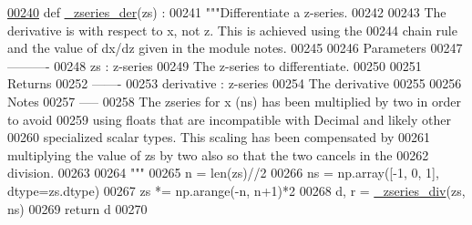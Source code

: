 \begin{DoxyCode}
\hypertarget{namespacepyneb_1_1utils_1_1chebyshev_l00240}{}\hyperlink{namespacepyneb_1_1utils_1_1chebyshev_adb39b6e9d3aba3bf3784a3364ec3e6ca}{00240} \textcolor{keyword}{def }\hyperlink{namespacepyneb_1_1utils_1_1chebyshev_adb39b6e9d3aba3bf3784a3364ec3e6ca}{\_zseries\_der}(zs) :
00241     \textcolor{stringliteral}{"""Differentiate a z-series.}
00242 \textcolor{stringliteral}{}
00243 \textcolor{stringliteral}{    The derivative is with respect to x, not z. This is achieved using the}
00244 \textcolor{stringliteral}{    chain rule and the value of dx/dz given in the module notes.}
00245 \textcolor{stringliteral}{}
00246 \textcolor{stringliteral}{    Parameters}
00247 \textcolor{stringliteral}{    ----------}
00248 \textcolor{stringliteral}{    zs : z-series}
00249 \textcolor{stringliteral}{        The z-series to differentiate.}
00250 \textcolor{stringliteral}{}
00251 \textcolor{stringliteral}{    Returns}
00252 \textcolor{stringliteral}{    -------}
00253 \textcolor{stringliteral}{    derivative : z-series}
00254 \textcolor{stringliteral}{        The derivative}
00255 \textcolor{stringliteral}{}
00256 \textcolor{stringliteral}{    Notes}
00257 \textcolor{stringliteral}{    -----}
00258 \textcolor{stringliteral}{    The zseries for x (ns) has been multiplied by two in order to avoid}
00259 \textcolor{stringliteral}{    using floats that are incompatible with Decimal and likely other}
00260 \textcolor{stringliteral}{    specialized scalar types. This scaling has been compensated by}
00261 \textcolor{stringliteral}{    multiplying the value of zs by two also so that the two cancels in the}
00262 \textcolor{stringliteral}{    division.}
00263 \textcolor{stringliteral}{}
00264 \textcolor{stringliteral}{    """}
00265     n = len(zs)//2
00266     ns = np.array([-1, 0, 1], dtype=zs.dtype)
00267     zs *= np.arange(-n, n+1)*2
00268     d, r = \hyperlink{namespacepyneb_1_1utils_1_1chebyshev_ad00f2653194746fa98c3421eb7c26f2c}{\_zseries\_div}(zs, ns)
00269     \textcolor{keywordflow}{return} d
00270 
\end{DoxyCode}
\hypertarget{namespacepyneb_1_1utils_1_1chebyshev_ad00f2653194746fa98c3421eb7c26f2c}{}
